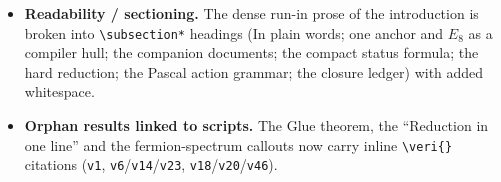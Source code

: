 \documentclass[11pt]{article}
\providecommand{\vref}[1]{\texttt{#1}}
\begin{document}
\begin{itemize}
  \texttt{keyeq} sets off load-bearing display formulas. The introduction's callouts use the
  non-breaking variants (\texttt{keyboxnb}/\texttt{winboxnb}/\texttt{gapboxnb}) so no box splits across
  a page, and the shared status card is non-breaking.
\item \textbf{Readability / sectioning.} The dense run-in prose of the introduction is broken into
  \texttt{\textbackslash subsection*} headings (In plain words; one anchor and $E_8$ as a compiler
  hull; the companion documents; the compact status formula; the hard reduction; the Pascal action
  grammar; the closure ledger) with added whitespace.
\item \textbf{Orphan results linked to scripts.} The Glue theorem, the ``Reduction in one line'' and the
  fermion-spectrum callouts now carry inline \texttt{\textbackslash veri\{\}} citations
  (\vref{v1}, \vref{v6}/\vref{v14}/\vref{v23}, \vref{v18}/\vref{v20}/\vref{v46}).
\end{itemize}
\end{document}

